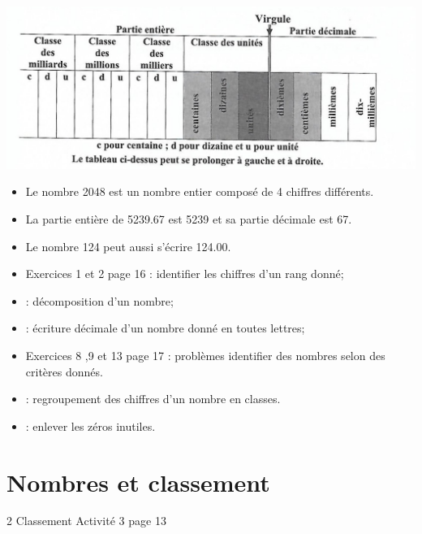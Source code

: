 \documentclass[12pt,a4paper]{article}
\begin{document}
\begin{center}
	\includegraphics[scale=1]{img/tab}
\end{center}

\begin{myexs}
	\begin{itemize}
		\item Le nombre \num{2048} est un nombre entier composé de 4 chiffres différents.
		\item La partie entière de \num{5239.67}  est \num{5239} et sa partie décimale est 67.	
		
		\item Le nombre \num{124} peut aussi s'écrire \num{124.00}.
	\end{itemize}
\end{myexs}

\begin{myexos}
	\begin{itemize}
		\item Exercices 1 et 2 page 16 : identifier les chiffres d'un rang donné;
		\item {} : décomposition d'un nombre;
		\item {} : \'ecriture décimale d'un nombre donné en toutes lettres;
		\item Exercices 8 ,9 et 13 page 17 : problèmes identifier des nombres selon des critères donnés.
		\item {} : regroupement des chiffres d'un nombre en classes.
		\item {} : enlever les zéros inutiles.
	\end{itemize}
	
\end{myexos}

\section{Nombres et classement}

\begin{myact}{2 Classement}
	Activité 3 page 13
\end{myact}
\end{document}
